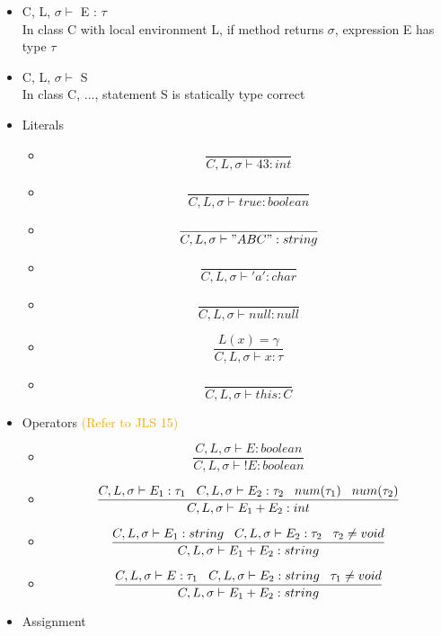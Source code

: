 \documentclass{article}
\begin{document}
\begin{itemize}
\begin{itemize}
\item C, L, \(\sigma \vdash\) E : \(\tau\) \\
In class C with local environment L, if method returns \(\sigma\), expression E has type \(\tau\)
\item C, L, \(\sigma \vdash\) S \\
In class C, ..., statement S is statically type correct
\item Literals
\begin{itemize}
\item $$ \frac{}{C, L, \sigma \vdash 43 : int}$$
\item $$ \frac{}{C, L, \sigma \vdash true : boolean}$$
\item $$ \frac{}{C, L, \sigma \vdash "ABC" : string}$$
\item $$\frac{}{C, L, \sigma \vdash 'a' : char}$$
\item $$\frac{}{C, L, \sigma \vdash null : null}$$
\item $$\frac{L(x) = \gamma}{C, L, \sigma \vdash x : \tau}$$
\item $$\frac{}{C, L, \sigma \vdash this : C} $$
\end{itemize}
\item Operators \textcolor{orange}{(Refer to JLS 15)}
\begin{itemize}
\item $$\frac{C, L, \sigma \vdash E : boolean}{C, L, \sigma \vdash !E : boolean} $$
\item $$\frac{C, L, \sigma \vdash E_1 : \tau_1  \hspace{0.3cm} C, L, \sigma \vdash E_2: \tau_2  \hspace{0.3cm} num(\tau_1) \hspace{0.3cm} num(\tau_2)}{C, L, \sigma \vdash E_1 + E_2 : int}$$
\item $$\frac{C, L, \sigma \vdash E_1 : string  \hspace{0.3cm} C, L, \sigma \vdash E_2: \tau_2  \hspace{0.3cm} \tau_2 \neq void}{C, L, \sigma \vdash E_1 + E_2 : string}$$
\item $$\frac{C, L, \sigma \vdash  E : \tau_1 \hspace{0.3cm} C, L, \sigma \vdash E_2 : string \hspace{0.3cm} \tau_1 \neq void}{C, L, \sigma \vdash  E_1 + E_2 : string}$$
\end{itemize}
\item Assignment 
\begin{itemize}

\end{itemize}
\end{itemize}
\end{itemize}
\end{document}
